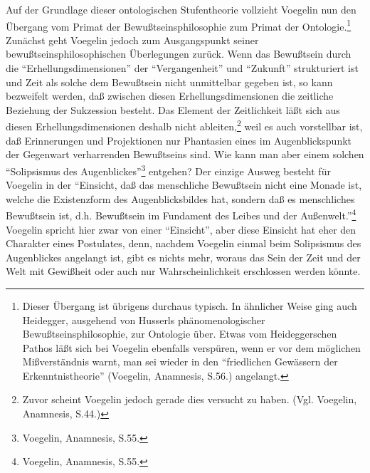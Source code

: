Auf der Grundlage dieser ontologischen Stufentheorie vollzieht Voegelin nun
den Übergang vom Primat der Bewußtseinsphilosophie zum Primat der
Ontologie.\footnote{Dieser Übergang ist übrigens durchaus typisch. In
  ähnlicher Weise ging auch Heidegger, ausgehend von Husserls
  phänomenologischer Bewußtseinsphilosophie, zur Ontologie über. Etwas vom
  Heideggerschen Pathos läßt sich bei Voegelin ebenfalls verspüren, wenn er
  vor dem möglichen Mißverständnis warnt, man sei wieder in den "`friedlichen
  Gewässern der Erkenntnistheorie"' (Voegelin, Anamnesis, S.56.) angelangt.}
Zunächst geht Voegelin jedoch zum Ausgangspunkt seiner
bewußtseinsphilosophischen Überlegungen zurück. Wenn das Bewußtsein durch die
"`Erhellungsdimensionen"' der "`Vergangenheit"' und "`Zukunft"' strukturiert
ist und Zeit als solche dem Bewußtsein nicht unmittelbar gegeben ist, so kann
bezweifelt werden, daß zwischen diesen Erhellungsdimensionen die zeitliche
Beziehung der Sukzession besteht. Das Element der Zeitlichkeit läßt sich aus
diesen Erhellungsdimensionen deshalb nicht ableiten,\footnote{Zuvor scheint
  Voegelin jedoch gerade dies versucht zu haben. (Vgl. Voegelin, Anamnesis,
  S.44.)} weil es auch vorstellbar ist, daß Erinnerungen und Projektionen nur
Phantasien eines im Augenblickspunkt der Gegenwart verharrenden Bewußtseins
sind. Wie kann man aber einem solchen "`Solipsismus des
Augenblickes"'\footnote{Voegelin, Anamnesis, S.55.} entgehen? Der einzige
Ausweg besteht für Voegelin in der "`Einsicht, daß das menschliche Bewußtsein
nicht eine Monade ist, welche die Existenzform des Augenblicksbildes hat,
sondern daß es menschliches Bewußtsein ist, d.h. Bewußtsein im Fundament des
Leibes und der Außenwelt."'\footnote{Voegelin, Anamnesis, S.55.} Voegelin
spricht hier zwar von einer "`Einsicht"', aber diese Einsicht hat eher den
Charakter eines Postulates, denn, nachdem Voegelin einmal beim Solipsismus des
Augenblickes angelangt ist, gibt es nichts mehr, woraus das Sein der Zeit und
der Welt mit Gewißheit oder auch nur Wahrscheinlichkeit erschlossen werden
könnte.

